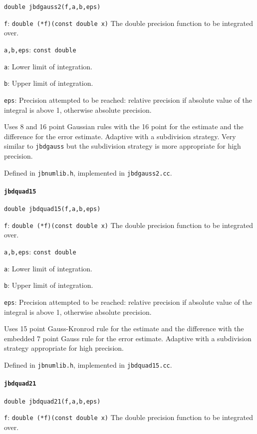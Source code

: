 \documentclass[12pt,a4paper]{article}
\newcommand{\mytt}[1]{\texttt{#1}}
\newcommand{\newfunction}[1]{\mytt{#1}\index{\mytt{#1}}}
\begin{document}
\mytt{double jbdgauss2(f,a,b,eps)}

\mytt{f}: \mytt{double (*f)(const double x)} The double precision
function to be integrated over.

\mytt{a,b,eps}: \mytt{const double}

\mytt{a}: Lower limit of integration.

\mytt{b}: Upper limit of integration.

\mytt{eps}: Precision attempted to be reached: relative precision if absolute
value of the integral is above 1, otherwise absolute precision.

Uses 8 and 16 point Gaussian rules with the 16 point for the estimate
and the difference for the error estimate. Adaptive with a subdivision strategy.
Very similar to \mytt{jbdgauss} but the subdivision strategy is more
appropriate for high precision.

Defined in \mytt{jbnumlib.h}, implemented in \mytt{jbdgauss2.cc}.

\paragraph{\newfunction{jbdquad15}}

\mytt{double jbdquad15(f,a,b,eps)}

\mytt{f}: \mytt{double (*f)(const double x)} The double precision
function to be integrated over.

\mytt{a,b,eps}: \mytt{const double}

\mytt{a}: Lower limit of integration.

\mytt{b}: Upper limit of integration.

\mytt{eps}: Precision attempted to be reached: relative precision if absolute
value of the integral is above 1, otherwise absolute precision.

Uses 15 point Gauss-Kronrod rule for the estimate
and the difference with the embedded 7 point Gauss rule for
the error estimate. Adaptive with a subdivision strategy
appropriate for high precision.

Defined in \mytt{jbnumlib.h}, implemented in \mytt{jbdquad15.cc}.

\paragraph{\newfunction{jbdquad21}}

\mytt{double jbdquad21(f,a,b,eps)}

\mytt{f}: \mytt{double (*f)(const double x)} The double precision
function to be integrated over.
\end{document}
